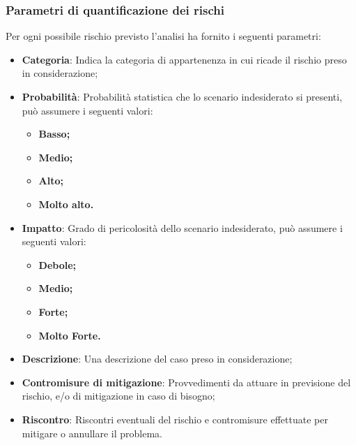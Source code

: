 \documentclass{scalatekids-article}
\begin{document}
\subsubsection{Parametri di quantificazione dei rischi}
Per ogni possibile rischio previsto l'analisi ha fornito i seguenti parametri:
\begin{itemize}
\item\textbf{Categoria}: Indica la categoria di appartenenza in cui ricade il
  rischio preso in considerazione;
\item\textbf{Probabilità}: Probabilità statistica che lo scenario indesiderato
  si presenti, può assumere i seguenti valori:
  \begin{itemize}
  \item\textbf{Basso;}
  \item\textbf{Medio;}
  \item\textbf{Alto;}
  \item\textbf{Molto alto.}
  \end{itemize}
\item\textbf{Impatto}: Grado di pericolosità dello scenario indesiderato, può
  assumere i seguenti valori:
  \begin{itemize}
  \item\textbf{Debole;}
  \item\textbf{Medio;}
  \item\textbf{Forte;}
  \item\textbf{Molto Forte.}
  \end{itemize}
\item\textbf{Descrizione}: Una descrizione del caso preso in considerazione;
\item\textbf{Contromisure di mitigazione}: Provvedimenti da attuare in
  previsione del rischio, e/o di mitigazione in caso di bisogno;
\item\textbf{Riscontro}: Riscontri eventuali del rischio e contromisure effettuate per mitigare o annullare il problema.
\end{itemize}
\iffalse
\end{document}

